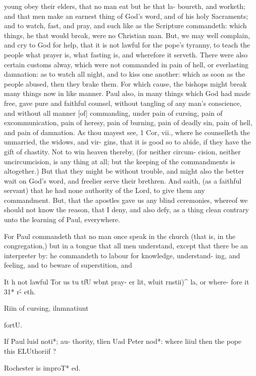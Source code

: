 \documentclass{custom}
\begin{document}
{young obey their elders, that no man eat but he that la- 
boureth, and worketh; and that men make an earnest 
thing of God's word, and of his holy Sacraments; and 
to watch, fast, and pray, and such like as the Scripture 
commandeth: which things, he that would break, were 
no Christian man. But, we may well complain, and 
cry to God for help, that it is not lawful for the pope's 
tyranny, to teach the people what prayer is, what fasting 
is, and wherefore it serveth. There were also certain 
customs alway, which were not commanded in pain of 
hell, or everlasting damnation: as to watch all night, 
and to kiss one another: which as soon as the people 
abused, then they brake them. For which cause, the 
bishops might break many things now in like manner. 
Paul also, in many things which God had made free, gave 
pure and faithful counsel, without tangling of any man's 
conscience, and without all manner [of] commanding, under 
pain of cursing, pain of excommunication, pain of heresy, 
pain of burning, pain of deadly sin, pain of hell, and 
pain of damnation. As thou mayest see, 1 Cor, vii., 
where he counselleth the unmarried, the widows, and vir- 
gins, that it is good so to abide, if they have the gift of 
chastity. Not to win heaven thereby, (for neither circum- 
cision, neither uncircumcision, is any thing at all; but the 
keeping of the commandments is altogether.) But that 
they might be without trouble, and might also the better 
wait on God's word, and freelier serve their brethren. And 
saith, (as a faithful servant) that he had none authority of 
the Lord, to give them any commandment. But, that the 
apostles gave us any blind ceremonies, whereof we should 
not know the reason, that I deny, and also defy, as a 
thing clean contrary unto the learning of Paul, everywhere. 

For Paul commandeth that no man once speak in the 
church (that is, in the congregation,) but in a tongue that all 
men understand, except that there be an interpreter by: 
he commandeth to labour for knowledge, understand- 
ing, and feeling, and to beware of superstition, and 

It h not 
lawful Tor 
us tu tfU 
wbnt pray- 
er lit, wluit 
rnstii)^ la, 
or where- 
fore it 31* r\'- 
eth. 

Riin of 
cursing, 
ilnmnatiunt 

fortU. 

If Paul luid 
noti*; au- 
thority, 
tlien Uad 
Peter nod*: 
where liiul 
then the 
pope this 
ELUthoriif ? 

Rochester 
is improT* 
ed. 


}
\end{document}
